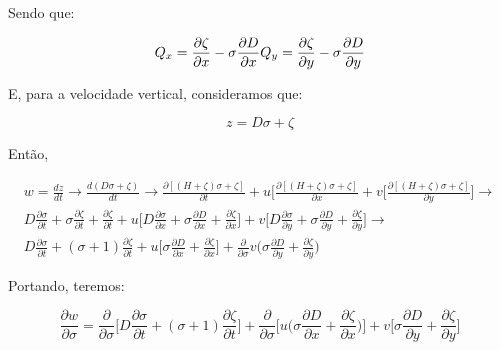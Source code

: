 \documentclass[11pt]{article}
\begin{document}
Sendo que:

\begin{equation}
    Q_x = \frac{\partial{\zeta}}{\partial{x}} - \sigma \frac{\partial{D}}{\partial{x}} \\
    Q_y = \frac{\partial{\zeta}}{\partial{y}} - \sigma \frac{\partial{D}}{\partial{y}} \\
\end{equation}

E, para a velocidade vertical, consideramos que:

\begin{equation}
    z = D\sigma + \zeta
\end{equation}

Então,

\begin{equation}
  \begin{aligned}
  w = \frac{dz}{dt} \rightarrow \frac{d(D\sigma + \zeta)}{dt} \rightarrow
  \frac{\partial{[(H + \zeta)\sigma + \zeta]}}{\partial{t}} + u\bigg[ \frac{\partial{[(H + \zeta)\sigma + \zeta]}}{\partial{x}} + v\bigg[ \frac{\partial{[(H + \zeta)\sigma + \zeta]}}{\partial{y}} \bigg] \rightarrow
  \\
  D\frac{\partial{\sigma}}{\partial{t}} + \sigma\frac{\partial{\zeta}}{\partial{t}} + \frac{\partial{\zeta}}{\partial{t}} + u\bigg[ D\frac{\partial{\sigma}}{\partial{x}} + \sigma\frac{\partial{D}}{\partial{x}} +
  \frac{\partial{\zeta}}{\partial{x}} \bigg] + v\bigg[ D\frac{\partial{\sigma}}{\partial{y}} + \sigma\frac{\partial{D}}{\partial{y}} + \frac{\partial{\zeta}}{\partial{y}} \bigg] \rightarrow
  \\
  D\frac{\partial{\sigma}}{\partial{t}} + (\sigma + 1)\frac{\partial{\zeta}}{\partial{t}} + u\bigg[ \sigma\frac{\partial{D}}{\partial{x}} + \frac{\partial{\zeta}}{\partial{x}} \bigg] +
  \frac{\partial}{\partial{\sigma}}v\bigg( \sigma\frac{\partial{D}}{\partial{y}} + \frac{\partial{\zeta}}{\partial{y}} \bigg)
  \label{eq:3.11}
  \end{aligned}
\end{equation}

Portando, teremos:

\begin{equation}
    \frac{\partial{w}}{\partial{\sigma}} = \frac{\partial}{\partial{\sigma}}\bigg[ D\frac{\partial{\sigma}}{\partial{t}} + (\sigma + 1)\frac{\partial{\zeta}}{\partial{t}} \bigg] + \frac{\partial}{\partial{\sigma}}\bigg[ u\bigg( \sigma\frac{\partial{D}}{\partial{x}} + \frac{\partial{\zeta}}{\partial{x}} \bigg) \bigg]+ v\bigg[ \sigma\frac{\partial{D}}{\partial{y}} + \frac{\partial{\zeta}}{\partial{y}} \bigg]
\end{equation}
\end{document}
